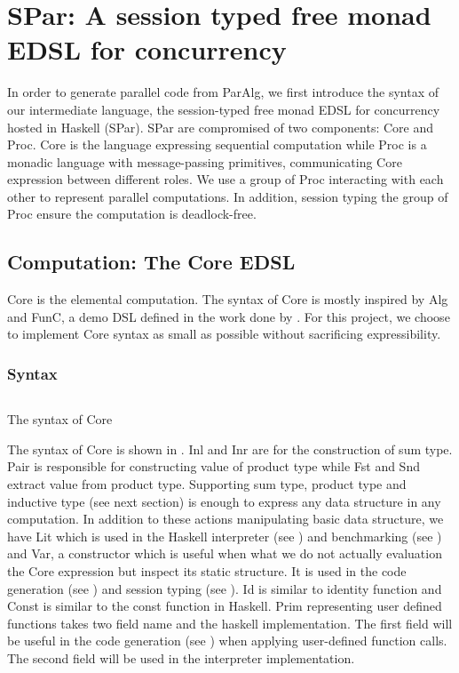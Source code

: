 \chapter{SPar: A session typed free monad EDSL for concurrency}
In order to generate parallel code from ParAlg, we first introduce the syntax of our intermediate language, the session-typed free monad EDSL for concurrency hosted in Haskell (SPar). SPar are compromised of two components: Core and Proc. Core is the language expressing sequential computation while Proc is a monadic language with message-passing primitives, communicating Core expression between different roles. We use a group of Proc interacting with each other to represent parallel computations. In addition, session typing the group of Proc ensure the computation is deadlock-free. 
\section{Computation: The Core EDSL}
Core is the elemental computation. The syntax of Core is mostly inspired by Alg \cite{AlgebraicMultipartyProtocol} and FunC, a demo DSL defined in the work done by \cite{svenningssonCombiningDeepShallow2015}. For this project, we choose to implement Core syntax as small as possible without sacrificing expressibility.
\subsection{Syntax}
\begin{listing}[ht]
    \inputminted{Haskell}{spar/core.hs}
    \caption{The syntax of Core}
    \label{spar:code:core}
\end{listing}
The syntax of Core is shown in . Inl and Inr are for the construction of sum type. Pair is responsible for constructing value of product type while Fst and Snd extract value from product type. Supporting sum type, product type and inductive type (see next section) is enough to express any data structure in any computation. In addition to these actions manipulating basic data structure, we have Lit which is used in the Haskell interpreter (see ) and benchmarking (see ) and Var, a constructor which is useful when what we do not actually evaluation the Core expression but inspect its static structure. It is used in the code generation (see ) and session typing (see ). Id is similar to identity function and Const is similar to the const function in Haskell. Prim representing user defined functions takes two field name and the haskell implementation. The first field will be useful in the code generation (see ) when applying user-defined function calls. The second field will be used in the interpreter implementation.   


